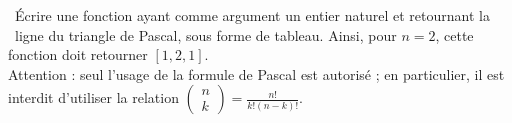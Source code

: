 \question\ Écrire une fonction  ayant comme argument un entier naturel 
et retournant la \ieme\ ligne du triangle de Pascal, sous forme de tableau. Ainsi, pour $n=2$, cette fonction doit retourner $[1,2,1]$.\\
Attention : seul l'usage de la formule de Pascal est autorisé ; en particulier,
il est interdit d'utiliser la relation
$\begin{pmatrix}n\\k\end{pmatrix}=\displaystyle\frac{n!}{k!(n-k)!}$.